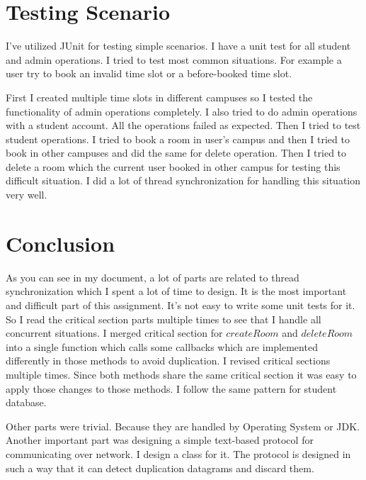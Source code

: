 \documentclass[12pt]{article}
\begin{document}
\section{Testing Scenario}
I've utilized JUnit for testing simple scenarios. I have a unit test for all student and admin operations. I tried to test most common situations. For example a user try to book an invalid time slot or a before-booked time slot.
\par First I created multiple time slots in different campuses so I tested the functionality of admin operations completely. I also tried to do admin operations with a student account. All the operations failed as expected. Then I tried to test student operations. I tried to book a room in user's campus and then I tried to book in other campuses and did the same for delete operation. Then I tried to delete a room which the current user booked in other campus for testing this difficult situation. I did a lot of thread synchronization for handling this situation very well.
\section{Conclusion}
As you can see in my document, a lot of parts are related to  thread synchronization which I spent a lot of time to design. It is the most important and difficult part of this assignment. It's not easy to write some unit tests for it. So I read the critical section parts multiple times to see that I handle all concurrent situations. I merged critical section for $createRoom$ and $deleteRoom$ into a single function which calls some callbacks which are implemented differently in those methods to avoid duplication. I revised critical sections multiple times. Since both methods share the same critical section it was easy to apply those changes to those methods. I follow the same pattern for student database.
\par Other parts were trivial. Because they are handled by Operating System or JDK. Another important part was designing a simple text-based protocol for communicating over network. I design a class for it. The protocol is designed in such a way that it can detect duplication datagrams and discard them.




\end{document}
